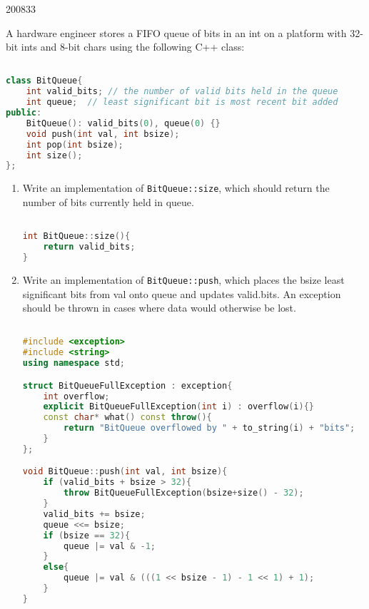 \documentclass[10pt,\jkfside,a4paper]{article}
\begin{document}
\begin{examquestion}{2008}{3}{3}

A hardware engineer stores a FIFO queue of bits in an int on a platform with
32-bit ints and 8-bit chars using the following C++ class:

\begin{lstlisting}[language=C++]

class BitQueue{
	int valid_bits;	// the number of valid bits held in the queue
	int queue;	// least significant bit is most recent bit added
public:
	BitQueue(): valid_bits(0), queue(0) {}
	void push(int val, int bsize);
	int pop(int bsize);
	int size();
};

\end{lstlisting}

\begin{enumerate}[label=(\alph*)]

\item Write an implementation of \texttt{BitQueue::size}, which should return
the number of bits currently held in queue.

\begin{lstlisting}[language=C++]

int BitQueue::size(){
	return valid_bits;
}

\end{lstlisting}

\item Write an implementation of \texttt{BitQueue::push}, which places the bsize
least significant bits from val onto queue and updates valid.bits. An
exception should be thrown in cases where data would otherwise be lost.

\begin{lstlisting}[language=C++]

#include <exception>
#include <string>
using namespace std;

struct BitQueueFullException : exception{
    int overflow;
    explicit BitQueueFullException(int i) : overflow(i){}
    const char* what() const throw(){
    	return "BitQueue overflowed by " + to_string(i) + "bits";
    }
};

void BitQueue::push(int val, int bsize){
    if (valid_bits + bsize > 32){
        throw BitQueueFullException(bsize+size() - 32);
    }
    valid_bits += bsize;
    queue <<= bsize;
    if (bsize == 32){
    	queue |= val & -1;
    }
    else{
    	queue |= val & (((1 << bsize - 1) - 1 << 1) + 1);
    }
}

\end{lstlisting}


\end{enumerate}
\end{examquestion}
\end{document}
